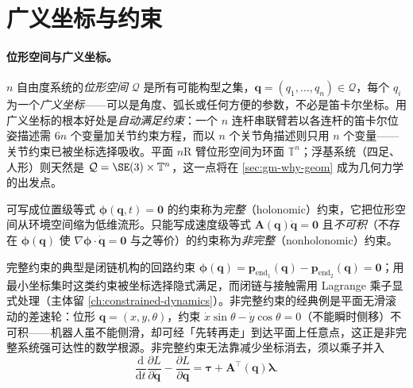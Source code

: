 \section{广义坐标与约束}
\label{sec:gm-coords}

\paragraph{位形空间与广义坐标。}
$n$ 自由度系统的\emph{位形空间} $\mathcal Q$ 是所有可能构型之集，$\mathbf q=(q_1,\dots,q_n)\in\mathcal Q$，每个 $q_i$ 为一个\emph{广义坐标}——可以是角度、弧长或任何方便的参数，不必是笛卡尔坐标。用广义坐标的根本好处是\emph{自动满足约束}：一个 $n$ 连杆串联臂若以各连杆的笛卡尔位姿描述需 $6n$ 个变量加关节约束方程，而以 $n$ 个关节角描述则只用 $n$ 个变量——关节约束已被坐标选择吸收。平面 $n$R 臂位形空间为环面 $\mathbb T^n$；浮基系统（四足、人形）则天然是 $\mathcal Q=\SE(3)\times\mathbb T^n$，这一点将在 \cref{sec:gm-why-geom} 成为几何力学的出发点。

\begin{definition}[完整约束与非完整约束]\label{def:gm-constraint}
可写成位置级等式 $\boldsymbol\phi(\mathbf q,t)=\mathbf 0$ 的约束称为\emph{完整}（holonomic）约束，它把位形空间从环境空间缩为低维流形。只能写成速度级等式 $\mathbf A(\mathbf q)\dot{\mathbf q}=\mathbf 0$ 且\emph{不可积}（不存在 $\boldsymbol\phi(\mathbf q)$ 使 $\nabla\boldsymbol\phi\cdot\dot{\mathbf q}=\mathbf 0$ 与之等价）的约束称为\emph{非完整}（nonholonomic）约束。
\end{definition}

完整约束的典型是闭链机构的回路约束 $\boldsymbol\phi(\mathbf q)=\mathbf p_{\mathrm{end}_1}(\mathbf q)-\mathbf p_{\mathrm{end}_2}(\mathbf q)=\mathbf 0$；用最小坐标集时这类约束被坐标选择隐式满足，而闭链与接触需用 Lagrange 乘子显式处理（主体留 \cref{ch:constrained-dynamics}）。非完整约束的经典例是平面无滑滚动的差速轮：位形 $\mathbf q=(x,y,\theta)$，约束 $\dot x\sin\theta-\dot y\cos\theta=0$（不能瞬时侧移）不可积——机器人虽不能侧滑，却可经「先转再走」到达平面上任意点，这正是非完整系统强可达性的数学根源。非完整约束无法靠减少坐标消去，须以乘子并入
\begin{equation}
  \frac{\mathrm d}{\mathrm dt}\frac{\partial L}{\partial\dot{\mathbf q}}-\frac{\partial L}{\partial\mathbf q}=\boldsymbol\tau+\mathbf A^\top(\mathbf q)\boldsymbol\lambda.
  \label{eq:gm-nonholonomic}
\end{equation}

